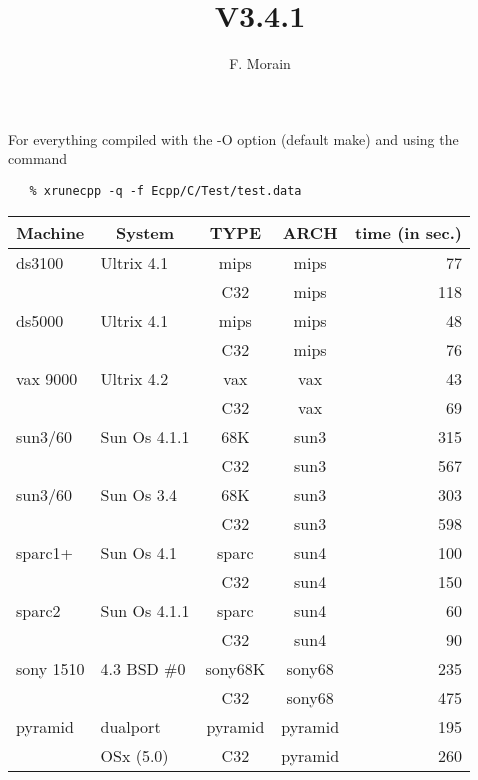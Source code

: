 
\title{V3.4.1}
\author{F. Morain}



\maketitle

\newcommand{\mc}[1]{\multicolumn{1}{|c}{#1}}
\newcommand{\md}[1]{\multicolumn{1}{|c|}{#1}}

\noindent
For everything compiled with the -O option (default make) and using the 
command

\begin{verbatim}
   % xrunecpp -q -f Ecpp/C/Test/test.data
\end{verbatim}

\vspace*{2mm}

\begin{center}
\begin{tabular}{|l|l|c|c||r|}\hline
\mc{Machine}&\md{System}&TYPE & ARCH & \md{time (in sec.)} \\ \hline
ds3100    & Ultrix 4.1   & mips    & mips    &77 \\
          &              & C32     & mips    &118 \\
\hline
ds5000    & Ultrix 4.1   & mips    & mips    &48  \\ 
          &              & C32     & mips    &76 \\
\hline
vax 9000  & Ultrix 4.2   & vax     & vax     &43\\ 
          &              & C32     & vax     &69\\
\hline
sun3/60   & Sun Os 4.1.1 & 68K     & sun3    &315 \\
          &              & C32     & sun3    &567\\
\hline
sun3/60   & Sun Os 3.4   & 68K     & sun3    &303 \\
          &              & C32     & sun3    &598 \\
\hline
sparc1+   & Sun Os 4.1   & sparc   & sun4    &100 \\
          &              & C32     & sun4    &150 \\
\hline
sparc2    & Sun Os 4.1.1 & sparc   & sun4    &60 \\
          &              & C32     & sun4    &90 \\
\hline
sony 1510 & 4.3 BSD \#0  & sony68K & sony68  &235 \\
          &              & C32     & sony68  &475 \\
\hline
pyramid   & dualport     & pyramid & pyramid &195 \\ 
          &  OSx (5.0)   & C32     & pyramid &260 \\
\hline
\end{tabular}
\end{center}


